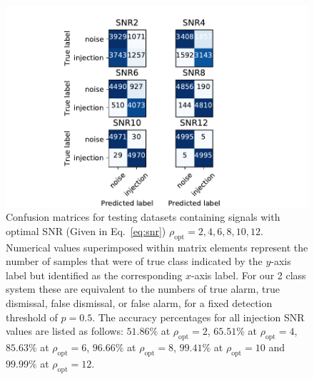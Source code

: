 %
%
\begin{figure}[]
\includegraphics[width=\columnwidth] {figures/confusion_matrix.pdf}
\caption[Confusion matrices for testing datasets containing signals with 
optimal SNR $\rho_{\mathrm{opt}}=2,4,6,8,10,12$]{Confusion matrices for 
testing datasets containing signals with optimal \ac{SNR}
(Given in Eq.~\ref{eq:snr}) $\rho_{\mathrm{opt}}=2,4,6,8,10,12$. 
Numerical values superimposed within matrix elements represent the number of 
samples that were of true class indicated by the $y$-axis label but 
identified as the corresponding $x$-axis label. For our 2 class 
system these are equivalent to the numbers of true alarm, true dismissal, 
false dismissal, or false alarm, for a fixed detection threshold 
of $p=0.5$. The accuracy
percentages for all injection SNR values are listed as follows: $51.86\%$ at
$\rho_{\mathrm{opt}}=2$, $65.51\%$ at $\rho_{\mathrm{opt}}=4$, 
$85.63\%$ at $\rho_{\mathrm{opt}}=6$, $96.66\%$ at
$\rho_{\mathrm{opt}}=8$, $99.41\%$ at $\rho_{\mathrm{opt}}=10$ and $99.99\%$ at
$\rho_{\mathrm{opt}}=12$.\label{fig:confusion}}
\end{figure}

